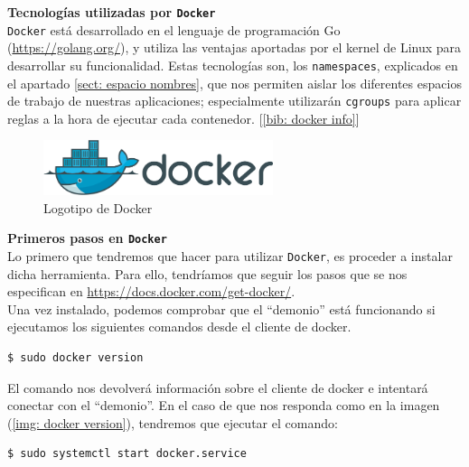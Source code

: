 \documentclass[a4paper, oneside, 12pt]{book}
\begin{document}
	\pagebreak
	
	\noindent \textbf{\large Tecnologías utilizadas por \texttt{Docker}}\\
	
	\noindent \texttt{Docker} está desarrollado en el lenguaje de programación Go (\url{https://golang.org/}), y utiliza las ventajas aportadas por el kernel de Linux para desarrollar su funcionalidad. Estas tecnologías son, los \texttt{namespaces}, explicados en el apartado \ref{sect: espacio nombres}, que nos permiten aislar los diferentes espacios de trabajo de nuestras aplicaciones; especialmente utilizarán \texttt{cgroups} para aplicar reglas a la hora de ejecutar cada contenedor. [\ref{bib: docker info}]
	
	\vspace{10px}
	
	\begin{figure}[h]
		\begin{center}
			\includegraphics[width=0.6\textwidth]{img/docker_logo.png}
			\caption{Logotipo de Docker}
			\label{img: docker logo}
		\end{center}
	\end{figure}
	
	\vspace{10px}
	\noindent \textbf{\large Primeros pasos en \texttt{Docker}}\\
	
	\noindent Lo primero que tendremos que hacer para utilizar \texttt{Docker}, es proceder a instalar dicha herramienta. Para ello, tendríamos que seguir los pasos que se nos especifican en \url{https://docs.docker.com/get-docker/}. \\
	
	\noindent Una vez instalado, podemos comprobar que el ``demonio'' está funcionando si ejecutamos los siguientes comandos desde el cliente de docker.
	\begin{verbatim}
$ sudo docker version
	\end{verbatim}

	\noindent El comando nos devolverá información sobre el cliente de docker e intentará conectar con el ``demonio''. En el caso de que nos responda como en la imagen (\ref{img: docker version}), tendremos que ejecutar el comando:
	\begin{verbatim}
$ sudo systemctl start docker.service
	\end{verbatim}
	
\end{document}
